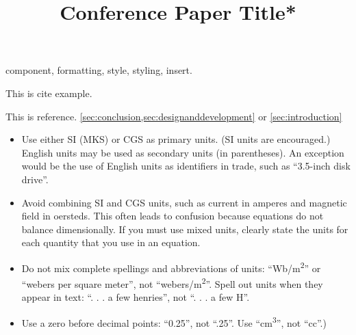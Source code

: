 \documentclass[conference]{IEEEtran}
\begin{document}
\renewcommand{\figurename}{Fig.} %

\title{Conference Paper Title*\\
}



\maketitle



\begin{IEEEkeywords}
    component, formatting, style, styling, insert.
\end{IEEEkeywords}














\newpage
This is cite example. \cite{IEEEexample:bluebookbook}

This is reference. \cref{sec:conclusion,sec:designanddevelopment} or \ref{sec:introduction}
\newline
\begin{itemize}
    \item Use either SI (MKS) or CGS as primary units. (SI units are encouraged.) English units may be used as secondary units (in parentheses). An exception would be the use of English units as identifiers in trade, such as ``3.5-inch disk drive''.
    \item Avoid combining SI and CGS units, such as current in amperes and magnetic field in oersteds. This often leads to confusion because equations do not balance dimensionally. If you must use mixed units, clearly state the units for each quantity that you use in an equation.
    \item Do not mix complete spellings and abbreviations of units: ``Wb/m\textsuperscript{2}'' or ``webers per square meter'', not ``webers/m\textsuperscript{2}''. Spell out units when they appear in text: ``. . . a few henries'', not ``. . . a few H''.
    \item Use a zero before decimal points: ``0.25'', not ``.25''. Use ``cm\textsuperscript{3}'', not ``cc''.)
\end{itemize}
\end{document}
